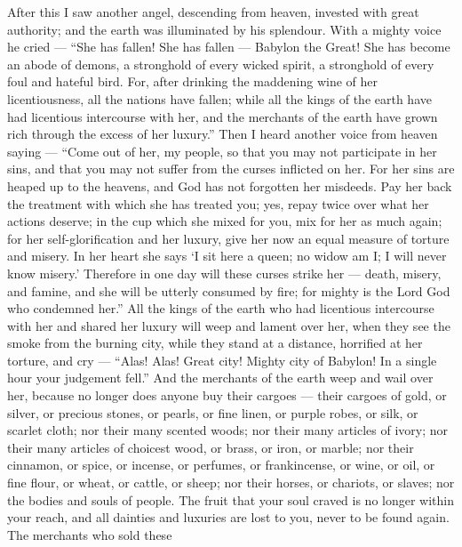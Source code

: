  After this I saw another angel, descending from heaven,
invested with great authority; and the earth was illuminated by his
splendour.  With a mighty voice he cried --- ``She has
fallen! She has fallen --- Babylon the Great! She has become an abode of
demons, a stronghold of every wicked spirit, a stronghold of every foul
and hateful bird.  For, after drinking the maddening wine of
her licentiousness, all the nations have fallen; while all the kings of
the earth have had licentious intercourse with her, and the merchants of
the earth have grown rich through the excess of her luxury.''
 Then I heard another voice from heaven saying --- ``Come
out of her, my people, so that you may not participate in her sins, and
that you may not suffer from the curses inflicted on her. 
For her sins are heaped up to the heavens, and God has not forgotten her
misdeeds.  Pay her back the treatment with which she has
treated you; yes, repay twice over what her actions deserve; in the cup
which she mixed for you, mix for her as much again;  for her
self-glorification and her luxury, give her now an equal measure of
torture and misery. In her heart she says `I sit here a queen; no widow
am I; I will never know misery.'  Therefore in one day will
these curses strike her --- death, misery, and famine, and she will be
utterly consumed by fire; for mighty is the Lord God who condemned
her.''  All the kings of the earth who had licentious
intercourse with her and shared her luxury will weep and lament over
her, when they see the smoke from the burning city,  while
they stand at a distance, horrified at her torture, and cry --- ``Alas!
Alas! Great city! Mighty city of Babylon! In a single hour your
judgement fell.''  And the merchants of the earth weep and
wail over her, because no longer does anyone buy their cargoes ---
 their cargoes of gold, or silver, or precious stones, or
pearls, or fine linen, or purple robes, or silk, or scarlet cloth; nor
their many scented woods; nor their many articles of ivory; nor their
many articles of choicest wood, or brass, or iron, or marble;
 nor their cinnamon, or spice, or incense, or perfumes, or
frankincense, or wine, or oil, or fine flour, or wheat, or cattle, or
sheep; nor their horses, or chariots, or slaves; nor the bodies and
souls of people.  The fruit that your soul craved is no
longer within your reach, and all dainties and luxuries are lost to you,
never to be found again.  The merchants who sold these
